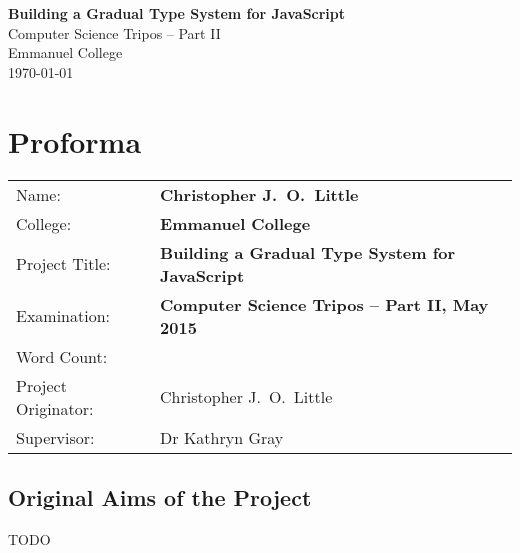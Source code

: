 \documentclass[12pt,a4paper,twoside,openright]{report}
\begin{document}





\pagestyle{empty}


\vspace*{60mm}
\begin{center}
  \Huge
  \textbf{Building a Gradual Type System for JavaScript} \\[5mm]
  Computer Science Tripos -- Part II \\[5mm]
  Emmanuel College \\[5mm]
  \today  %
\end{center}


\pagestyle{plain}

\chapter*{Proforma}

{\large
  \begin{tabular}{ll}
	Name:               & \bf Christopher J.~O.~Little             \\
	College:            & \bf Emmanuel College                      \\
	Project Title:      & \bf Building a Gradual Type System for JavaScript  \\
	Examination:        & \bf Computer Science Tripos -- Part II, May 2015  \\
	Word Count:         & \bf \footnotemark[1] \\
	Project Originator: & Christopher J.~O.~Little 			\\
	Supervisor:         & Dr Kathryn Gray                   \\ 
  \end{tabular}
}


\section*{Original Aims of the Project}
TODO
\end{document}

